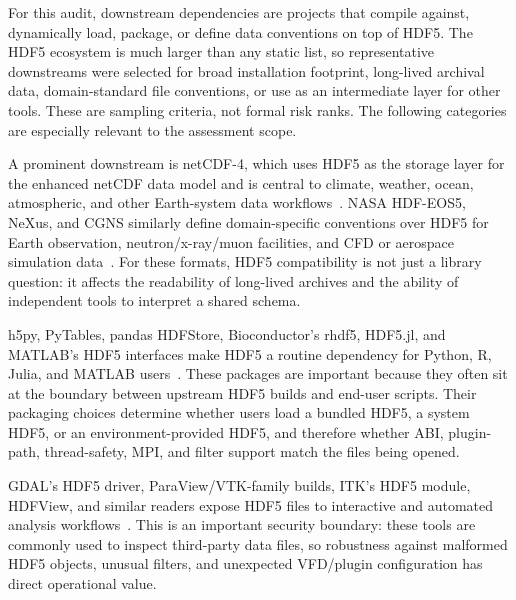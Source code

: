 \documentclass[../main.tex]{subfiles}
\begin{document}
For this audit, downstream dependencies are projects that compile against,
dynamically load, package, or define data conventions on top of HDF5. The HDF5
ecosystem is much larger than any static list, so representative downstreams
were selected for broad installation footprint, long-lived archival data,
domain-standard file conventions, or use as an intermediate layer for other
tools. These are sampling criteria, not formal risk ranks. The following
categories are especially relevant to the assessment scope.

\begin{description}[leftmargin=1.5em,style=nextline]
    \item[Scientific data models and exchange formats.]
    A prominent downstream is netCDF-4, which uses HDF5 as the storage layer for
    the enhanced netCDF data model and is central to climate, weather,
    ocean, atmospheric, and other Earth-system data workflows~\cite{netcdf4-format}.
    NASA HDF-EOS5, NeXus, and CGNS similarly define domain-specific conventions
    over HDF5 for Earth observation, neutron/x-ray/muon facilities, and CFD or
    aerospace simulation data~\cite{hdf-eos5,nexus-format,cgns-hdf5}. For these
    formats, HDF5 compatibility is not just a library question: it affects the
    readability of long-lived archives and the ability of independent tools to
    interpret a shared schema.

    \item[Language bindings and analysis libraries.]
    h5py, PyTables, pandas HDFStore, Bioconductor's rhdf5, HDF5.jl, and MATLAB's
    HDF5 interfaces make HDF5 a routine dependency for Python, R, Julia, and
    MATLAB users~\cite{h5py-docs,pytables-docs,pandas-hdfstore,rhdf5,hdf5-jl,matlab-hdf5}.
    These packages are important because they often sit at the boundary between
    upstream HDF5 builds and end-user scripts. Their packaging choices determine
    whether users load a bundled HDF5, a system HDF5, or an environment-provided
    HDF5, and therefore whether ABI, plugin-path, thread-safety, MPI, and filter
    support match the files being opened.

    \item[Geospatial, visualization, and inspection tools.]
    GDAL's HDF5 driver, ParaView/VTK-family builds, ITK's HDF5 module, HDFView,
    and similar readers expose HDF5 files to interactive and automated analysis
    workflows~\cite{gdal-hdf5,paraview-build,itk-hdf5}. This is an important
    security boundary: these tools are commonly used to inspect third-party data
    files, so robustness against malformed HDF5 objects, unusual filters, and
    unexpected VFD/plugin configuration has direct operational value.


\end{description}
\end{document}
